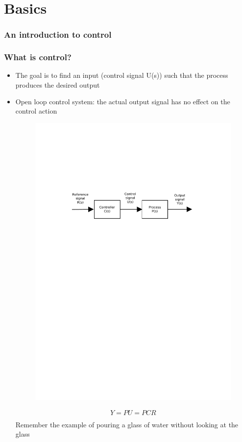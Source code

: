 \section{Basics}

\begin{frame}
\frametitle{An introduction to control}
\end{frame}

\begin{frame}
\frametitle{What is control?}
\begin{itemize}
	\item The goal is to find an input (control signal U(s)) such that the process produces the desired output
	\item Open loop control system: the actual output signal has no effect on the control action
\begin{figure}
\centering
\includegraphics[width=0.7\linewidth]{Open-Loop}
\label{fig:Open-Loop}
\end{figure}
\begin{align*}
	Y = PU = PCR \\
\end{align*}
Remember the example of pouring a glass of water without looking at the glass
\end{itemize}
\end{frame}

